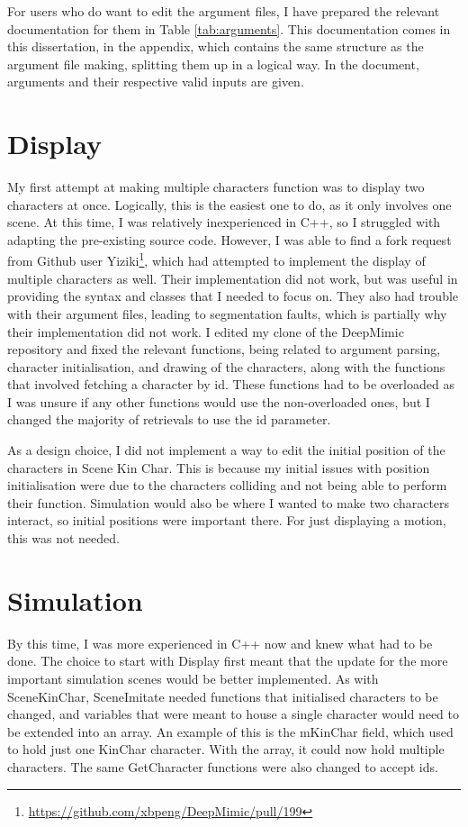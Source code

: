 \documentclass{l4proj}
\begin{document}
For users who do want to edit the argument files, I have prepared the relevant documentation for them in Table \ref{tab:arguments}. This documentation comes in this dissertation, in the appendix, which contains the same structure as the argument file making, splitting them up in a logical way. In the document, arguments and their respective valid inputs are given.

\section{Display}
My first attempt at making multiple characters function was to display two characters at once. Logically, this is the easiest one to do, as it only involves one scene. At this time, I was relatively inexperienced in C++, so I struggled with adapting the pre-existing source code. However, I was able to find a fork request from Github user Yiziki\footnote{\url{https://github.com/xbpeng/DeepMimic/pull/199}}, which had attempted to implement the display of multiple characters as well. Their implementation did not work, but was useful in providing the syntax and classes that I needed to focus on. They also had trouble with their argument files, leading to segmentation faults, which is partially why their implementation did not work. I edited my clone of the DeepMimic repository and fixed the relevant functions, being related to argument parsing, character initialisation, and drawing of the characters, along with the functions that involved fetching a character by id. These functions had to be overloaded as I was unsure if any other functions would use the non-overloaded ones, but I changed the majority of retrievals to use the id parameter.

As a design choice, I did not implement a way to edit the initial position of the characters in Scene Kin Char. This is because my initial issues with position initialisation were due to the characters colliding and not being able to perform their function. Simulation would also be where I wanted to make two characters interact, so initial positions were important there. For just displaying a motion, this was not needed.

\section{Simulation}
By this time, I was more experienced in C++ now and knew what had to be done. The choice to start with Display first meant that the update for the more important simulation scenes would be better implemented. As with SceneKinChar, SceneImitate needed functions that initialised characters to be changed, and variables that were meant to house a single character would need to be extended into an array. An example of this is the mKinChar field, which used to hold just one KinChar character. With the array, it could now hold multiple characters. The same GetCharacter functions were also changed to accept ids.
\end{document}
